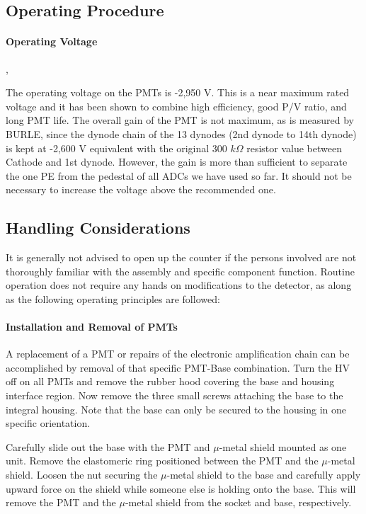 \subsection{Operating Procedure}

\paragraph{Operating Voltage}
,

The operating voltage on the PMTs is -2,950 V. This is a near maximum rated 
voltage and it has been shown to combine high efficiency, good P/V ratio,   
and long PMT life. The overall gain of the PMT is not maximum, as is   
measured by BURLE, since the dynode chain of the 13 dynodes (2nd dynode to   
14th dynode) is kept at -2,600 V equivalent with the original 300 $k\Omega$   
resistor value between Cathode and 1st dynode. However, the gain is more   
than sufficient to separate the one PE from the pedestal of all ADCs we have   
used so far. It should not be necessary to increase the voltage above the   
recommended one. 


\subsection{Handling Considerations}


It is generally not advised to open up the counter if the persons involved are
not thoroughly familiar with the assembly and specific component function.
Routine operation does not require any hands on modifications to the detector,
as along as the following operating principles are followed: 

\paragraph{Installation and Removal of PMTs}

A replacement of a PMT or repairs of the electronic amplification chain can   
be accomplished by removal of that specific PMT-Base combination. Turn the   
HV off on all PMTs and remove the rubber hood covering the base and housing 
interface region. Now remove the three small screws attaching the base to   
the integral housing. Note that the base can only be secured to the housing   
in one specific orientation. 

Carefully slide out the base with the PMT and $\mu$-metal shield mounted as one
unit. Remove the elastomeric ring positioned between the PMT and the   
$\mu$-metal shield. Loosen the nut securing the $\mu$-metal shield to the   
base and carefully apply upward force on the shield while someone else is   
holding onto the base. This will remove the PMT and the $\mu$-metal shield   
from the socket and base, respectively. 

